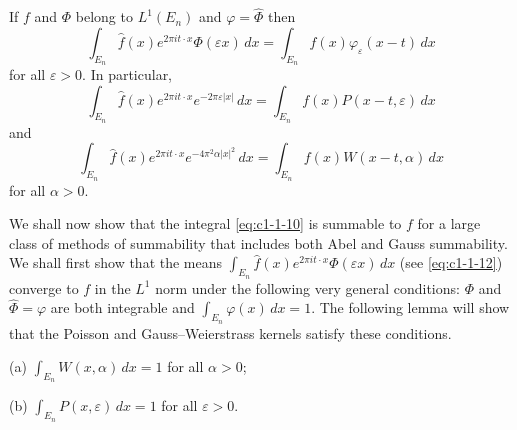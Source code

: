 \begin{theorem}\label{thm:c1-1-16}
If $f$ and $\Phi$ belong to $L^{1}(E_{n})$ and $\varphi = \hat{\Phi}$ then
\[
\int_{E_{n}}\hat{f}(x)e^{2\pi i t\cdot x}\Phi(\varepsilon x)\,dx
=\int_{E_{n}}f(x)\varphi_{\varepsilon}(x-t)\,dx
\]
for all $\varepsilon > 0$. In particular,
\[
\int_{E_{n}}\hat{f}(x)e^{2\pi i t\cdot x}e^{-2\pi\varepsilon|x|}\,dx
=\int_{E_{n}}f(x)P(x-t,\varepsilon)\,dx
\]
and
\[
\int_{E_{n}}\hat{f}(x)e^{2\pi i t\cdot x}e^{-4\pi^{2}\alpha|x|^{2}}\,dx
=\int_{E_{n}}f(x)W(x-t,\alpha)\,dx
\]
for all $\alpha > 0$.
\end{theorem}

We shall now show that the integral \eqref{eq:c1-1-10} is summable to $f$ for a
large class of methods of summability that includes both Abel and Gauss
summability. We shall first show that the means
$\int_{E_{n}} \hat{f}(x) e^{2\pi i t \cdot x} \Phi(\varepsilon x) \, dx$
(see \eqref{eq:c1-1-12}) converge to $f$ in the $L^{1}$ norm under the following
very general conditions: $\Phi$ and $\hat{\Phi} = \varphi$ are both integrable
and $\int_{E_{n}} \varphi(x) \, dx = 1$. The following lemma will show that the
Poisson and Gauss--Weierstrass kernels satisfy these conditions.

\begin{lemma}\label{lem:c1-1-17}
\textup{(a)} $\int_{E_{n}} W(x, \alpha) \, dx = 1$ for all $\alpha > 0$;

\textup{(b)} $\int_{E_{n}} P(x, \varepsilon) \, dx = 1$ for all
$\varepsilon > 0$.
\end{lemma}


